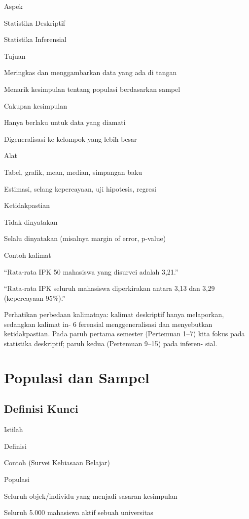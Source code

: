\documentclass[
  indonesian,
  letterpaper,
]{book}
\begin{document}
Aspek

Statistika Deskriptif

Statistika Inferensial

Tujuan

Meringkas dan menggambarkan data yang ada di tangan

Menarik kesimpulan tentang populasi berdasarkan sampel

Cakupan kesimpulan

Hanya berlaku untuk data yang diamati

Digeneralisasi ke kelompok yang lebih besar

Alat

Tabel, grafik, mean, median, simpangan baku

Estimasi, selang kepercayaan, uji hipotesis, regresi

Ketidakpastian

Tidak dinyatakan

Selalu dinyatakan (misalnya margin of error, p-value)

Contoh kalimat

``Rata-rata IPK 50 mahasiswa yang disurvei adalah 3,21.''

``Rata-rata IPK seluruh mahasiswa diperkirakan antara 3,13 dan 3,29
(kepercayaan 95\%).''

Perhatikan perbedaan kalimatnya: kalimat deskriptif hanya melaporkan,
sedangkan kalimat in- 6 ferensial menggeneralisasi dan menyebutkan
ketidakpastian. Pada paruh pertama semester (Pertemuan 1--7) kita fokus
pada statistika deskriptif; paruh kedua (Pertemuan 9--15) pada inferen-
sial.

\section{Populasi dan Sampel}\label{populasi-dan-sampel}

\subsection{Definisi Kunci}\label{definisi-kunci}

Istilah

Definisi

Contoh (Survei Kebiasaan Belajar)

Populasi

Seluruh objek/individu yang menjadi sasaran kesimpulan

Seluruh 5.000 mahasiswa aktif sebuah universitas
\end{document}
